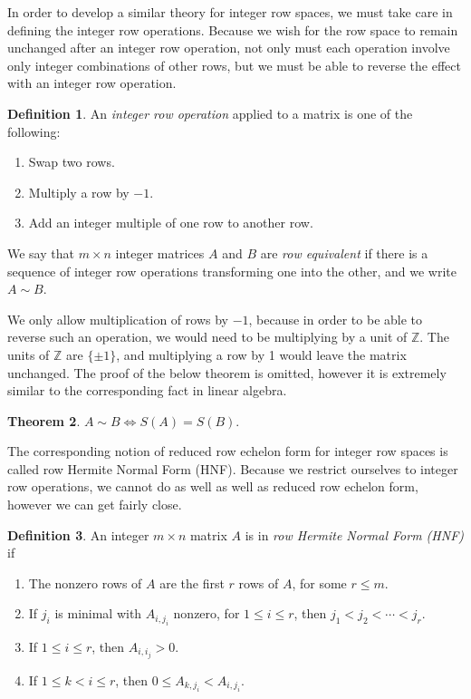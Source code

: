 \documentclass[12pt,a4paper]{article}
\newcommand{\Z}{\mathbb{Z}}
\theoremstyle{definition}
\newtheorem{theorem}{Theorem}[section]
\newtheorem{definition}[theorem]{Definition}
\begin{document}
In order to develop a similar theory for integer row spaces, we must take care in defining the integer row operations. Because we wish for the row space to remain unchanged after an integer row operation, not only must each operation involve only integer combinations of other rows, but we must be able to reverse the effect with an integer row operation.

\begin{definition}
  An \emph{integer row operation} applied to a matrix is one of the following:
  \begin{enumerate}
  \item Swap two rows.
  \item Multiply a row by $-1$.
  \item Add an integer multiple of one row to another row.
  \end{enumerate}
  We say that $m\times n$ integer matrices $A$ and $B$ are \emph{row equivalent} if there is a sequence of integer row operations transforming one into the other, and we write $A\sim B$.
\end{definition}

We only allow multiplication of rows by $-1$, because in order to be able to reverse such an operation, we would need to be multiplying by a unit of $\Z$. The units of $\Z$ are $\{\pm1\}$, and multiplying a row by 1 would leave the matrix unchanged. The proof of the below theorem is omitted, however it is extremely similar to the corresponding fact in linear algebra.

\begin{theorem}
  $A\sim B \iff S(A)=S(B)$.
\end{theorem}

The corresponding notion of reduced row echelon form for integer row spaces is called row Hermite Normal Form (HNF). Because we restrict ourselves to integer row operations, we cannot do as well as well as reduced row echelon form, however we can get fairly close.

\begin{definition}
  An integer $m\times n$ matrix $A$ is in \emph{row Hermite Normal Form (HNF)} if
  \begin{enumerate}
  \item The nonzero rows of $A$ are the first $r$ rows of $A$, for some $r\leq m$.
  \item If $j_i$ is minimal with $A_{i,j_i}$ nonzero, for $1\leq i\leq r$, then $j_1<j_2<\cdots<j_r$.
  \item If $1\leq i\leq r$, then $A_{i,i_j}>0$.
  \item If $1\leq k<i\leq r$, then $0\leq A_{k,j_i}<A_{i,j_i}$.
  \end{enumerate}
\end{definition}
\end{document}
